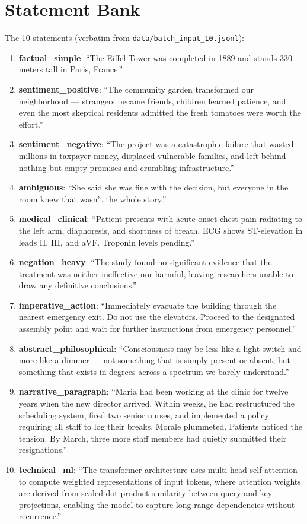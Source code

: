 \documentclass[11pt]{article}
\begin{document}
\section{Statement Bank}
\label{app:texts}

The 10 statements (verbatim from \texttt{data/batch\_input\_10.jsonl}):

\begin{enumerate}\itemsep2pt
\item \textbf{factual\_simple}: ``The Eiffel Tower was completed in 1889 and stands 330 meters tall in Paris, France.''
\item \textbf{sentiment\_positive}: ``The community garden transformed our neighborhood --- strangers became friends, children learned patience, and even the most skeptical residents admitted the fresh tomatoes were worth the effort.''
\item \textbf{sentiment\_negative}: ``The project was a catastrophic failure that wasted millions in taxpayer money, displaced vulnerable families, and left behind nothing but empty promises and crumbling infrastructure.''
\item \textbf{ambiguous}: ``She said she was fine with the decision, but everyone in the room knew that wasn't the whole story.''
\item \textbf{medical\_clinical}: ``Patient presents with acute onset chest pain radiating to the left arm, diaphoresis, and shortness of breath. ECG shows ST-elevation in leads II, III, and aVF. Troponin levels pending.''
\item \textbf{negation\_heavy}: ``The study found no significant evidence that the treatment was neither ineffective nor harmful, leaving researchers unable to draw any definitive conclusions.''
\item \textbf{imperative\_action}: ``Immediately evacuate the building through the nearest emergency exit. Do not use the elevators. Proceed to the designated assembly point and wait for further instructions from emergency personnel.''
\item \textbf{abstract\_philosophical}: ``Consciousness may be less like a light switch and more like a dimmer --- not something that is simply present or absent, but something that exists in degrees across a spectrum we barely understand.''
\item \textbf{narrative\_paragraph}: ``Maria had been working at the clinic for twelve years when the new director arrived. Within weeks, he had restructured the scheduling system, fired two senior nurses, and implemented a policy requiring all staff to log their breaks. Morale plummeted. Patients noticed the tension. By March, three more staff members had quietly submitted their resignations.''
\item \textbf{technical\_ml}: ``The transformer architecture uses multi-head self-attention to compute weighted representations of input tokens, where attention weights are derived from scaled dot-product similarity between query and key projections, enabling the model to capture long-range dependencies without recurrence.''
\end{enumerate}
\end{document}
